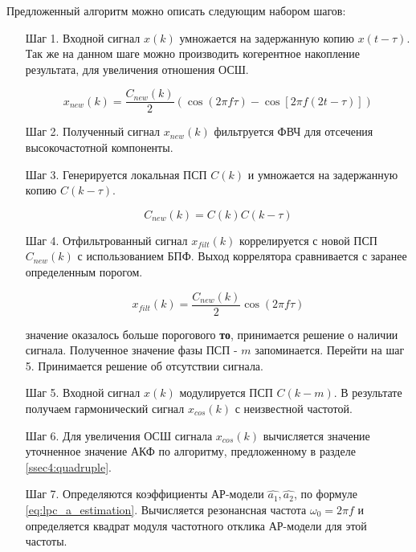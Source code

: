 Предложенный алгоритм можно описать следующим набором шагов:
\begin{itemize}
\item[Шаг 1.] Входной сигнал ${x(k)}$ умножается на задержанную копию ${x(t-\tau)}$. Так же
	на данном шаге можно производить когерентное накопление результата, для
	увеличения отношения ОСШ.

	\begin{center}
	\begin{equation}
		x_{new}(k) = \frac{C_{new}(k)}{2} \left(\cos (2\pi f \tau) - \cos \left[2 \pi f (2t - \tau)\right]\right)
	\end{equation}
	\end{center}

\item[Шаг 2.] Полученный сигнал ${x_{new}(k)}$ фильтруется ФВЧ для отсечения высокочастотной компоненты.
\item[Шаг 3.] Генерируется локальная ПСП ${C(k)}$ и умножается на задержанную копию ${C(k-\tau)}$.

	\begin{center}
	\begin{equation}
		C_{new}(k) = C(k)C(k-\tau)
	\end{equation}
	\end{center}

\item[Шаг 4.] Отфильтрованный сигнал ${x_{filt}(k)}$ коррелируется с новой ПСП ${C_{new}(k)}$
	с использованием БПФ. Выход коррелятора сравнивается с заранее определенным порогом.

	\begin{center}
	\begin{equation}
		x_{filt}(k) = \frac{C_{new}(k)}{2} \cos (2\pi f \tau)
	\end{equation}
	\end{center}

	  значение оказалось больше порогового {\bf{то}},
		принимается решение о наличии сигнала. Полученное значение фазы ПСП  - ${m}$ запоминается.
		Перейти на шаг 5.
		Принимается решение об отсутствии сигнала.
\item[Шаг 5.] Входной сигнал ${x(k)}$ модулируется ПСП ${C(k-m)}$. В результате получаем гармонический
	сигнал ${x_{cos}(k)}$ с неизвестной частотой.
\item[Шаг 6.] Для увеличения ОСШ сигнала ${x_{cos}(k)}$ вычисляется значение уточненное значение АКФ
	по алгоритму, предложенному в разделе \ref{ssec4:quadruple}.
\item[Шаг 7.] Определяются коэффициенты АР-модели ${\hat{a_1}, \hat{a_2}}$, по формуле \ref{eq:lpc_a_estimation}. 
	Вычисляется резонансная частота ${\omega_0 = 2 \pi f}$ и определяется квадрат модуля частотного отклика АР-модели для этой частоты. 
\end{itemize}

